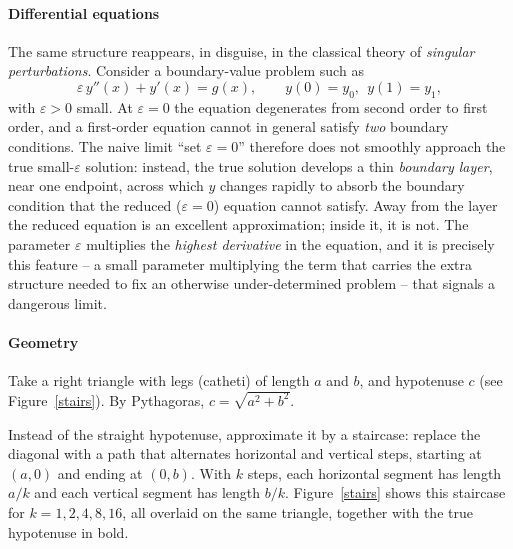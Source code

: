 \paragraph{Differential equations}
The same structure reappears, in disguise, in the classical
theory of \emph{singular perturbations}. Consider a
boundary-value problem such as
\begin{equation}
\varepsilon\, y''(x) + y'(x) = g(x), \qquad y(0)=y_0,\ \ y(1)=y_1,
\end{equation}
with $\varepsilon>0$ small. At $\varepsilon=0$ the equation
degenerates from second order to first order, and a first-order
equation cannot in general satisfy \emph{two} boundary
conditions. The naive limit ``set $\varepsilon=0$'' therefore
does not smoothly approach the true small-$\varepsilon$
solution: instead, the true solution develops a thin
\emph{boundary layer}, near one endpoint, across which $y$
changes rapidly to absorb the boundary condition that the
reduced ($\varepsilon=0$) equation cannot satisfy. Away from the
layer the reduced equation is an excellent approximation; inside
it, it is not. The parameter $\varepsilon$ multiplies the
\emph{highest derivative} in the equation, and it is precisely
this feature -- a small parameter multiplying the term that
carries the extra structure needed to fix an otherwise
under-determined problem -- that signals a dangerous limit. 

\paragraph{Geometry}
Take a right triangle with legs (catheti) of length $a$ and $b$, and hypotenuse
$c$ (see  Figure~\ref{stairs}). 
By Pythagoras,
$c=\sqrt{a^2+b^2}$. 

Instead of the straight hypotenuse, approximate it by a staircase: replace the
diagonal with a path that alternates horizontal and vertical steps, starting
at $(a,0)$ and ending at $(0,b)$. With $k$ steps, each horizontal segment has
length $a/k$ and each vertical segment has length $b/k$. Figure~\ref{stairs}
shows this staircase for $k = 1,2,4,8,16$, all overlaid on the same triangle,
together with the true hypotenuse in bold.

